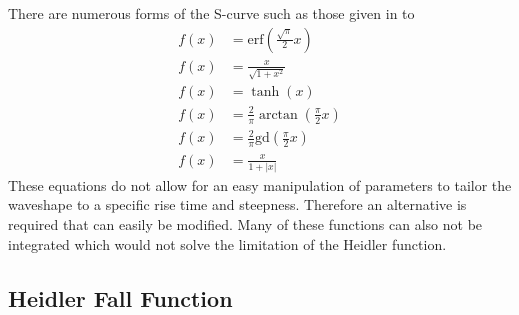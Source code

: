 There are numerous forms of the S-curve such as those given in  to 
\begin{subequations}
    \label{eqn:scurve}
    \begin{align}
        f(x) & = \mathrm{erf} \left ( \frac{\sqrt{\pi}}{2}x \right ) \label{eqn:erf} \\
        f(x) & = \frac{x}{\sqrt{1+x^2}} \label{eqn:sqrt} \\
        f(x) & = \tanh(x) \label{eqn:tanh} \\
        f(x) & = \frac{2}{\pi}\arctan \left ( \frac{\pi}{2}x \right ) \label{eqn:atan} \\
        f(x) & = \frac{2}{\pi}\mathrm{gd} \left ( \frac{\pi}{2}x \right ) \label{eqn:gd} \\
        f(x) & = \frac{x}{1+|x|} \label{eqn:abs}
    \end{align}
\end{subequations}
These equations do not allow for an easy manipulation of parameters to tailor the waveshape to a specific rise time and steepness. Therefore an alternative is required that can easily be modified. Many of these functions can also not be integrated which would not solve the limitation of the Heidler function.



\subsection{Heidler Fall Function}
\label{sub:approx_heidler_fall_function}

